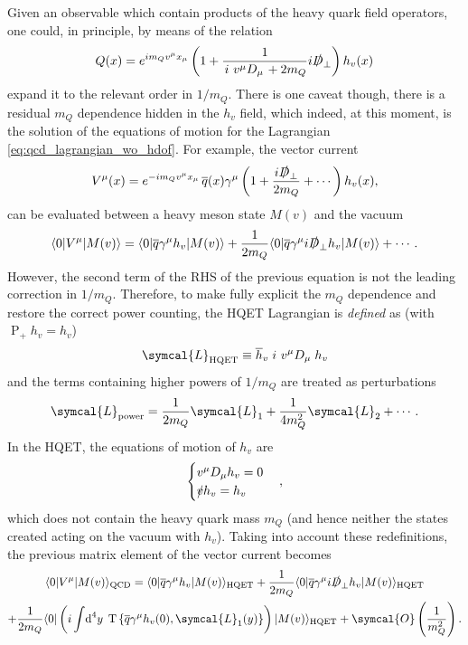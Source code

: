 Given an observable which contain products of the heavy quark field operators, one could, in principle, by means of the relation
\begin{equation}
  Q(x) = e^{i m_Q v^\mu x_\mu} \left( 1 + \frac{1}{\left. i \ v^\mu D_\mu \right. + 2 m_Q} i \slashed{D}_\perp \right) h_v(x)
\end{equation}
expand it to the relevant order in $1 / m_Q$. There is one caveat though, there is a residual $m_Q$ dependence hidden in the $h_v$ field, which indeed, at this moment, is the solution of the equations of motion for the Lagrangian \eqref{eq:qcd_lagrangian_wo_hdof}. For example, the vector current
\begin{equation}
  V^\mu (x) = e^{- i m_Q v^\mu x_\mu} \, \overline{q}(x) \gamma^\mu \left( 1 + \frac{i \slashed{D}_\perp}{2 m_Q} + \cdots \right) h_v (x) ,
\end{equation}
can be evaluated between a heavy meson state $M(v)$ and the vacuum
\begin{equation}
  \langle 0 \rvert V^\mu \lvert M(v) \rangle = \langle 0 \rvert \overline{q} \gamma^\mu h_v \lvert M(v) \rangle + \frac{1}{2 m_Q} \langle 0 \rvert \overline{q} \gamma^\mu i \slashed{D}_\perp h_v \lvert M(v) \rangle + \cdots .
\end{equation}
However, the second term of the RHS of the previous equation is not the leading correction in $1/m_Q$. Therefore, to make fully explicit the $m_Q$ dependence and restore the correct power counting, the HQET Lagrangian is \emph{defined} as (with $\operatorname{P}_+ h_v = h_v$)
\begin{equation}
  \symcal{L}_\text{HQET} \equiv \adj{h}_v \left. i \ v^\mu D_\mu \right. h_v
  \label{eq:hqet_lagrangian}
\end{equation}
and the terms containing higher powers of $1 / m_Q$ are treated as perturbations
\begin{equation}
  \symcal{L}_\text{power} = \frac{1}{2 m_Q} \symcal{L}_1 + \frac{1}{4 m_Q^2} \symcal{L}_2 + \cdots .
  \label{eq:hqet_power_corrections}
\end{equation}
In the HQET, the equations of motion of $h_v$ are
\begin{equation}
  \begin{cases}
    v^\mu D_\mu h_v = 0 \\
    \slashed{v} h_v = h_v
  \end{cases},
\end{equation}
which does not contain the heavy quark mass $m_Q$ (and hence neither the states created acting on the vacuum with $h_v$). Taking into account these redefinitions, the previous matrix element of the vector current becomes
\begin{multline}
  \langle 0 \rvert V^\mu \lvert M(v) \rangle_\text{QCD} = \langle 0 \rvert \adj{q} \gamma^\mu h_v \lvert M(v) \rangle_\text{HQET} + \frac{1}{2 m_Q} \langle 0 \rvert \adj{q} \gamma^\mu i \slashed{D}_\perp h_v \lvert M(v) \rangle_\text{HQET} \\ + \frac{1}{2 m_Q} \langle 0 \rvert \left( i \int \! \D^4 \! y \; \operatorname{T} \left\{ \adj{q} \gamma^\mu h_v(0) , \symcal{L}_1(y) \right\} \right) \lvert M(v) \rangle_\text{HQET} + \symcal{O} \left( \frac{1}{m_Q^2} \right) .
\end{multline}

